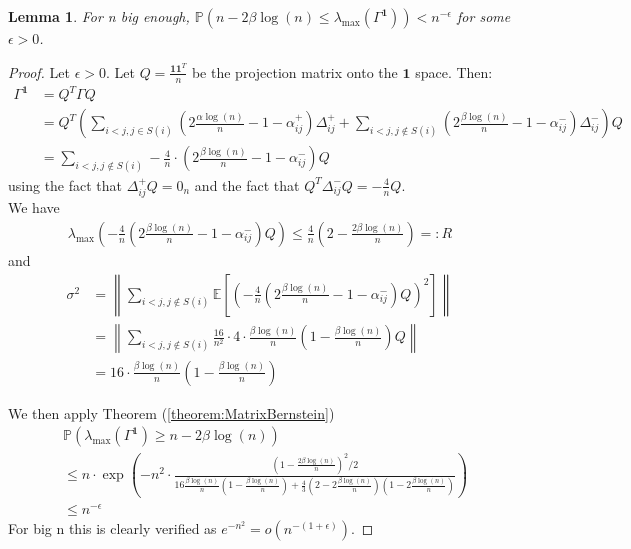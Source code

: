 \documentclass[english]{article}
\newtheorem{lemma}{Lemma}
\newcommand{\1}{\textbf{1}}
\newcommand{\A}{\frac{\alpha \log(n)}{n}}
\newcommand{\B}{\frac{\beta \log(n)}{n}}
\newcommand{\p}{\mathbb{P}}
\begin{document}
\begin{lemma} \label{lemma:proj1}
For n big enough, $\p\left(n-2\beta \log(n) \leq \lambda_{\max}(\Gamma^{\1})\right)<n^{-\epsilon}$ for some $\epsilon>0$.
\end{lemma}
  \begin{proof} Let $\epsilon>0$. Let $Q=\frac{\1\1^T}{n}$ be the projection matrix onto the $\1$ space. Then:
\begin{align}
\Gamma^\1 &= Q^T \Gamma Q\\
&= Q^T \left( \sum_{i<j, j \in S(i)}\left(2\A-1- \alpha_{ij}^+\right)\Delta^+_{ij}+\sum_{i<j, j \notin S(i)} \left(2\B-1 -\alpha_{ij}^-\right) \Delta^-_{ij} \right) Q \\
&= \sum_{i<j, j \notin S(i)}  -\frac{4}{n}\cdot \left(2\B-1 -\alpha_{ij}^-\right)Q
\end{align}
using the fact that $\Delta_{ij}^+Q=0_{n}$ and the fact that $Q^T \Delta_{ij}^- Q =-\frac{4}{n}Q$. \\

We have
\begin{align}
\lambda_{\max}\left(-\frac{4}{n}\left(2\B-1 -\alpha_{ij}^-\right)Q\right) \leq \frac{4}{n}\left(2-\frac{2\beta \log(n)}{n}\right) =:R
\end{align}
and
\begin{align} \sigma^2 &= \left\| \sum_{i<j, j \notin S(i)} \mathbb{E}\left[\left(-\frac{4}{n}\left(2\B-1-\alpha_{ij}^-\right)Q\right)^2\right] \right\| \\
&= \left\|\sum_{i<j, j \notin S(i)} \frac{16}{n^2} \cdot 4 \cdot \B\left(1-\B\right)Q \right\| \\
&= 16 \cdot \B\left(1-\B\right)
\end{align}

We then apply Theorem (\ref{theorem:MatrixBernstein})
\begin{align}
& \p\left(\lambda_{\max}(\Gamma^\1) \geq n - 2\beta \log(n)\right) \\
& \leq n\cdot \exp \left( -n^2 \cdot \frac{\left(1-\frac{2\beta\log(n)}{n}\right)^2/2}{16\B\left(1-\B\right)+\frac{4}{3}\left(2-2\B\right)\left(1-2\B\right)}\right)\\
& \leq n^{-\epsilon}
\end{align}
For big n this is clearly verified as $e^{-n^2}=o\left(n^{-(1+\epsilon)}\right)$.
\end{proof}
\end{document}
